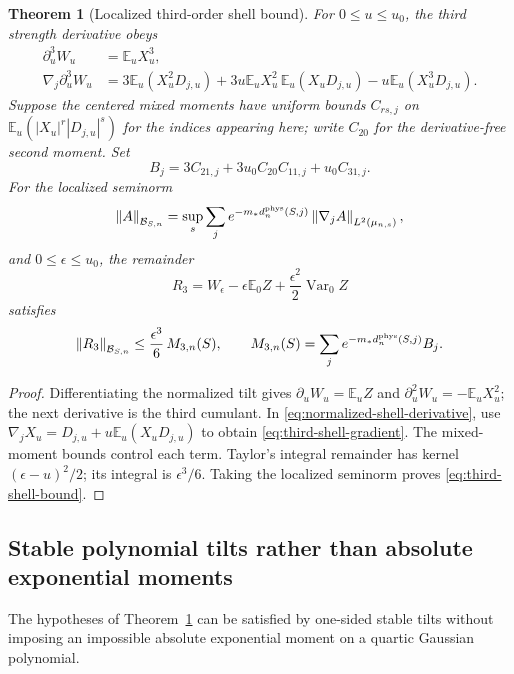 \documentclass[11pt,a4paper,oneside]{book}
\theoremstyle{plain}
\newtheorem{theorem}{Theorem}[chapter]
\theoremstyle{definition}
\theoremstyle{remark}
\newcommand{\E}{\mathbb E}
\newcommand{\Var}{\operatorname{Var}}
\newcommand{\norm}[1]{\left\lVert#1\right\rVert}
\newcommand{\src}[2]{\cite{#1}}
\begin{document}
\begin{theorem}[Localized third-order shell bound]
\label{thm:localized-shell}
For $0\le u\le u_0$, the third strength derivative obeys
\begin{align}
 \partial_u^3W_u&=\E_uX_u^3,\\
 \nabla_j\partial_u^3W_u
 &=3\E_u(X_u^2D_{j,u})
   +3u\E_uX_u^2\,\E_u(X_uD_{j,u})
   -u\E_u(X_u^3D_{j,u}).
 \label{eq:third-shell-gradient}
\end{align}
Suppose the centered mixed moments have uniform bounds $C_{rs,j}$ on
$\E_u(|X_u|^r|D_{j,u}|^s)$ for the indices appearing here; write $C_{20}$
for the derivative-free second moment.  Set
\[
 B_j=3C_{21,j}+3u_0C_{20}C_{11,j}+u_0C_{31,j}.
\]
For the localized seminorm
\[
 \norm{A}_{\mathcal B_{S,n}}
 =\sup_s\sum_j e^{-m_*d_n^{\rm phys}(S,j)}
                \norm{\nabla_jA}_{L^2(\mu_{n,s})},
\]
and $0\le\epsilon\le u_0$, the remainder
\begin{equation}
 R_3=W_\epsilon-\epsilon\E_0Z
                    +\frac{\epsilon^2}{2}\Var_0Z
 \label{eq:third-shell-remainder}
\end{equation}
satisfies
\begin{equation}
 \norm{R_3}_{\mathcal B_{S,n}}
 \le\frac{\epsilon^3}{6}\,M_{3,n}(S),\qquad
 M_{3,n}(S)=\sum_j e^{-m_*d_n^{\rm phys}(S,j)}B_j.
 \label{eq:third-shell-bound}
\end{equation}
\end{theorem}
\begin{proof}
Differentiating the normalized tilt gives
$\partial_uW_u=\E_uZ$ and
$\partial_u^2W_u=-\E_uX_u^2$; the next derivative is the third cumulant.
In \eqref{eq:normalized-shell-derivative}, use
$\nabla_jX_u=D_{j,u}+u\E_u(X_uD_{j,u})$ to obtain
\eqref{eq:third-shell-gradient}.  The mixed-moment bounds control each
term.  Taylor's integral remainder has kernel
$(\epsilon-u)^2/2$; its integral is $\epsilon^3/6$.  Taking the localized
seminorm proves \eqref{eq:third-shell-bound}.
\end{proof}
\src{R17}{lem:v17v1-differentiation,thm:v17v1-gradient,cor:v17v1-banach}

\subsection{Stable polynomial tilts rather than absolute exponential moments}
The hypotheses of Theorem~\ref{thm:localized-shell} can be satisfied by
one-sided stable tilts without imposing an impossible absolute exponential
moment on a quartic Gaussian polynomial.
\end{document}
